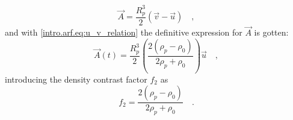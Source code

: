 \begin{equation}
    \vec A = \frac{R_p^3}{2}(\vec v - \vec u)\quad,
\end{equation}
and with \eqref{intro.arf.eq:u_v_relation} the definitive expression for $\vec A$ is gotten:
\begin{equation}\label{intro.arf.eq:A_field_Rp}
    \vec A(t) = \frac{R_p^3}{2}\left(\frac{2(\rho_p-\rho_0)}{2\rho_p+\rho_0}\right)\vec u\quad,
\end{equation}
introducing the density contrast factor $f_2$ as
\begin{equation}\label{intro.arf.eq:f2}
    f_2 = \frac{2(\rho_p-\rho_0)}{2\rho_p+\rho_0}\quad.
\end{equation}
